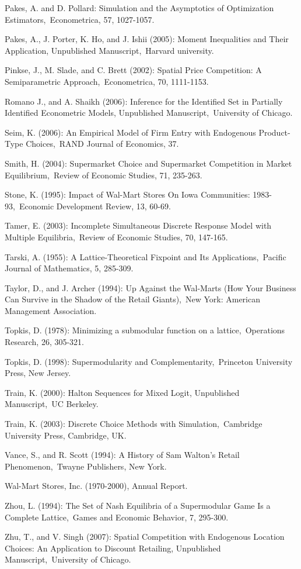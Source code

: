 \documentclass[notitlepage,onecolumn,11pt]{article}
\begin{document}
\begin{thebibliography}{99}
 Pakes, A. and D. Pollard: Simulation and the Asymptotics of
Optimization Estimators,\ Econometrica, 57, 1027-1057.

\bibitem{} Pakes, A., J. Porter, K. Ho, and J. Ishii (2005): Moment
Inequalities and Their Application, Unpublished Manuscript,\ Harvard
university.

 Pinkse, J., M. Slade, and C. Brett (2002): Spatial Price
Competition: A Semiparametric Approach,\ Econometrica, 70, 1111-1153.

\bibitem{} Romano J., and A. Shaikh (2006): Inference for the Identified Set
in Partially Identified Econometric Models, Unpublished Manuscript,\
University of Chicago.

 Seim, K. (2006): An Empirical Model of Firm Entry with
Endogenous Product-Type Choices,\ RAND Journal of Economics, 37.

\bibitem{} Smith, H. (2004): Supermarket Choice and Supermarket Competition
in Market Equilibrium,\ Review of Economic Studies, 71, 235-263.

 Stone, K. (1995): Impact of Wal-Mart Stores On Iowa
Communities: 1983-93,\ Economic Development Review, 13, 60-69.

\bibitem{} Tamer, E. (2003): Incomplete Simultaneous Discrete Response Model
with Multiple Equilibria,\ Review of Economic Studies, 70, 147-165.

\bibitem{} Tarski, A. (1955): A Lattice-Theoretical Fixpoint and Its
Applications,\ Pacific Journal of Mathematics, 5, 285-309.

 Taylor, D., and J. Archer (1994): Up Against the Wal-Marts
(How Your Business Can Survive in the Shadow of the Retail Giants),\ New
York: American Management Association.

\bibitem{} Topkis, D. (1978): Minimizing a submodular function on a
lattice,\ Operations Research, 26, 305-321.

 Topkis, D. (1998): Supermodularity and Complementarity,\
Princeton University Press, New Jersey.

 Train, K. (2000): Halton Sequences for Mixed Logit,
Unpublished Manuscript,\ UC Berkeley.

\bibitem{} Train, K. (2003): Discrete Choice Methods with Simulation,\
Cambridge University Press, Cambridge, UK.

\bibitem{18d} Vance, S., and R. Scott (1994): A History of Sam Walton's
Retail Phenomenon,\ Twayne Publishers, New York.

\bibitem{19} Wal-Mart Stores, Inc. (1970-2000), Annual Report.

\bibitem{} Zhou, L. (1994): The Set of Nash Equilibria of a Supermodular
Game Is a Complete Lattice,\ Games and Economic Behavior, 7, 295-300.

\bibitem{} Zhu, T., and V. Singh (2007): Spatial Competition with Endogenous
Location Choices: An Application to Discount Retailing, Unpublished
Manuscript,\ University of Chicago.
\end{thebibliography}
\end{document}
